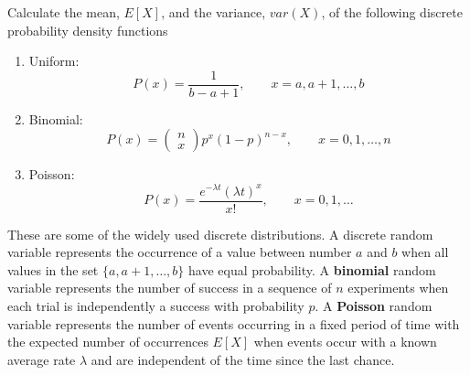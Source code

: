 \documentclass[11pt]{article}
\def\x{\mathbf{x}}
\begin{document}
Calculate the mean, $E[X]$, and the variance, $var(X)$, of the following discrete probability density functions
\begin{enumerate}
    \item Uniform: 
    \begin{equation}
        P(x) = \frac{1}{b-a+1}, \qquad x=a, a+1, \dots, b
    \end{equation}
    
    \item Binomial: 
    \begin{equation}
        P(x) = \begin{pmatrix}n \\x \end{pmatrix} p^x (1-p)^{n-x}, \qquad x=0,1,\dots,n
    \end{equation}
    
    \item Poisson: 
    \begin{equation}
        P(x) = \frac{e^{-\lambda t}(\lambda t)^x}{x!}, \qquad x=0,1,\dots 
    \end{equation}
    
\end{enumerate}


These are some of the widely used discrete distributions. A discrete random variable represents the occurrence of a value between number $a$ and $b$ when all values in the set $\{a,a+1,\dots,b\}$ have equal probability. A \textbf{binomial} random variable represents the number of success in a sequence of $n$ experiments when each trial is independently a success with probability $p$. A \textbf{Poisson} random variable represents the number of events occurring in a fixed period of time with the expected number of occurrences $E[X]$ when events occur with a known average rate $\lambda$ and are independent of the time since the last chance. %
\end{document}
